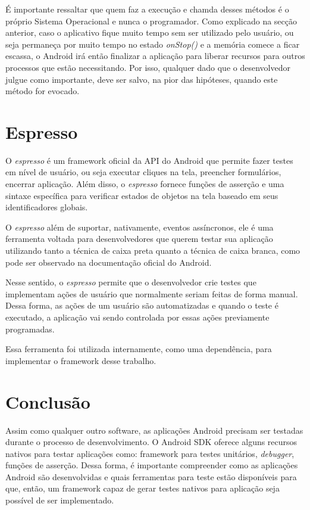 \documentclass[
    12pt,       %
    openright,      %
    twoside,      %
    a4paper,      %
    english,      %
    french,       %
    spanish,      %
    brazil,       %
    ]{abntex2}
\begin{document}
        É importante ressaltar que quem faz a execução e chamda desses métodos é o próprio Sistema
        Operacional e nunca o programador. Como explicado na secção anterior, caso o aplicativo
        fique muito tempo sem ser utilizado pelo usuário, ou seja permaneça por muito tempo no
        estado \textit{onStop()} e a memória comece a ficar escassa, o Android irá então finalizar
        a aplicação para liberar recursos para outros processos que estão necessitando. Por
        isso, qualquer dado que o desenvolvedor julgue como importante, deve ser salvo, na pior das
        hipóteses, quando este método for evocado.

      \section{Espresso}
        O \textit{espresso} é um framework oficial da API do Android que permite fazer testes em nível
        de usuário, ou seja executar cliques na tela, preencher formulários, encerrar aplicação. Além
        disso, o \textit{espresso} fornece funções de asserção e uma sintaxe específica para verificar
        estados de objetos na tela baseado em seus identificadores globais.

        O \textit{espresso} além de suportar, nativamente, eventos assíncronos, ele é uma ferramenta voltada
        para desenvolvedores que querem testar sua aplicação utilizando tanto a técnica de caixa preta
        quanto a técnica de caixa branca, como pode ser observado na documentação oficial do Android.

        Nesse sentido, o \textit{espresso} permite que o desenvolvedor crie testes que implementam
        ações de usuário que normalmente seriam feitas de forma manual. Dessa forma, as ações de um usuário
        são automatizadas e quando o teste é executado, a aplicação vai sendo controlada por essas ações
        previamente programadas.

        Essa ferramenta foi utilizada internamente, como uma dependência, para implementar o framework desse
        trabalho.

      \section{Conclusão}
        Assim como qualquer outro software, as aplicações Android precisam ser testadas durante o
        processo de desenvolvimento. O Android SDK oferece alguns recursos nativos para testar aplicações
        como: framework para testes unitários, \textit{debugger}, funções de asserção. Dessa forma, é
        importante compreender como as aplicações Android são desenvolvidas e quais ferramentas para teste
        estão disponíveis para que, então, um framework capaz de gerar testes nativos para aplicação seja
        possível de ser implementado.
\end{document}
